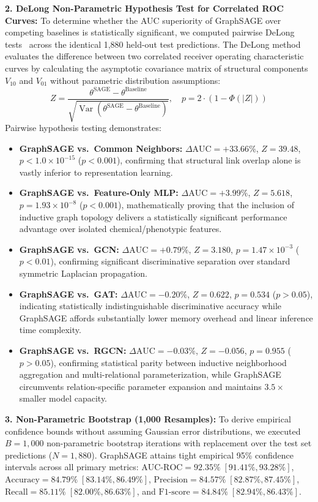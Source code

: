 \documentclass[conference,a4paper]{IEEEtran}
\begin{document}
\textbf{2. DeLong Non-Parametric Hypothesis Test for Correlated ROC Curves:} To determine whether the AUC superiority of GraphSAGE over competing baselines is statistically significant, we computed pairwise DeLong tests~\cite{ref_delong} across the identical 1,880 held-out test predictions. The DeLong method evaluates the difference between two correlated receiver operating characteristic curves by calculating the asymptotic covariance matrix of structural components $V_{10}$ and $V_{01}$ without parametric distribution assumptions:
\begin{equation}
Z = \frac{\theta^{\text{SAGE}} - \theta^{\text{Baseline}}}{\sqrt{\operatorname{Var}(\theta^{\text{SAGE}} - \theta^{\text{Baseline}})}}, \quad p = 2 \cdot \left(1 - \Phi(|Z|)\right)
\end{equation}
Pairwise hypothesis testing demonstrates:
\begin{itemize}
    \item \textbf{GraphSAGE vs.\ Common Neighbors:} $\Delta\text{AUC} = +33.66\%$, $Z = 39.48$, $p < 1.0 \times 10^{-15}$ ($p < 0.001$), confirming that structural link overlap alone is vastly inferior to representation learning.
    \item \textbf{GraphSAGE vs.\ Feature-Only MLP:} $\Delta\text{AUC} = +3.99\%$, $Z = 5.618$, $p = 1.93 \times 10^{-8}$ ($p < 0.001$), mathematically proving that the inclusion of inductive graph topology delivers a statistically significant performance advantage over isolated chemical/phenotypic features.
    \item \textbf{GraphSAGE vs.\ GCN:} $\Delta\text{AUC} = +0.79\%$, $Z = 3.180$, $p = 1.47 \times 10^{-3}$ ($p < 0.01$), confirming significant discriminative separation over standard symmetric Laplacian propagation.
    \item \textbf{GraphSAGE vs.\ GAT:} $\Delta\text{AUC} = -0.20\%$, $Z = 0.622$, $p = 0.534$ ($p > 0.05$), indicating statistically indistinguishable discriminative accuracy while GraphSAGE affords substantially lower memory overhead and linear inference time complexity.
    \item \textbf{GraphSAGE vs.\ RGCN:} $\Delta\text{AUC} = -0.03\%$, $Z = -0.056$, $p = 0.955$ ($p > 0.05$), confirming statistical parity between inductive neighborhood aggregation and multi-relational parameterization, while GraphSAGE circumvents relation-specific parameter expansion and maintains $3.5\times$ smaller model capacity.
\end{itemize}

\textbf{3. Non-Parametric Bootstrap (1,000 Resamples):} To derive empirical confidence bounds without assuming Gaussian error distributions, we executed $B = 1,000$ non-parametric bootstrap iterations with replacement over the test set predictions ($N = 1,880$). GraphSAGE attains tight empirical 95\% confidence intervals across all primary metrics: $\text{AUC-ROC} = 92.35\% \; [91.41\%, 93.28\%]$, $\text{Accuracy} = 84.79\% \; [83.14\%, 86.49\%]$, $\text{Precision} = 84.57\% \; [82.87\%, 87.45\%]$, $\text{Recall} = 85.11\% \; [82.00\%, 86.63\%]$, and $\text{F1-score} = 84.84\% \; [82.94\%, 86.43\%]$.
\end{document}

